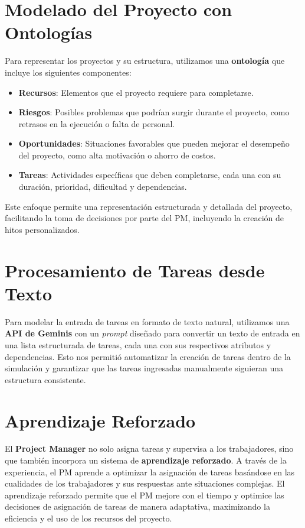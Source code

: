 \documentclass[a4paper, 12pt]{article}
\begin{document}
\section{Modelado del Proyecto con Ontologías}
Para representar los proyectos y su estructura, utilizamos una \textbf{ontología} que incluye los siguientes componentes:
\begin{itemize}
    \item \textbf{Recursos}: Elementos que el proyecto requiere para completarse.
    \item \textbf{Riesgos}: Posibles problemas que podrían surgir durante el proyecto, como retrasos en la ejecución o falta de personal.
    \item \textbf{Oportunidades}: Situaciones favorables que pueden mejorar el desempeño del proyecto, como alta motivación o ahorro de costos.
    \item \textbf{Tareas}: Actividades específicas que deben completarse, cada una con su duración, prioridad, dificultad y dependencias.
\end{itemize}
Este enfoque permite una representación estructurada y detallada del proyecto, facilitando la toma de decisiones por parte del PM, incluyendo la creación de hitos personalizados.

\section{Procesamiento de Tareas desde Texto}
Para modelar la entrada de tareas en formato de texto natural, utilizamos una \textbf{API de Geminis} con un \textit{prompt} diseñado para convertir un texto de entrada en una lista estructurada de tareas, cada una con sus respectivos atributos y dependencias. Esto nos permitió automatizar la creación de tareas dentro de la simulación y garantizar que las tareas ingresadas manualmente siguieran una estructura consistente.

\section{Aprendizaje Reforzado}
El \textbf{Project Manager} no solo asigna tareas y supervisa a los trabajadores, sino que también incorpora un sistema de \textbf{aprendizaje reforzado}. A través de la experiencia, el PM aprende a optimizar la asignación de tareas basándose en las cualidades de los trabajadores y sus respuestas ante situaciones complejas. El aprendizaje reforzado permite que el PM mejore con el tiempo y optimice las decisiones de asignación de tareas de manera adaptativa, maximizando la eficiencia y el uso de los recursos del proyecto.
\end{document}
